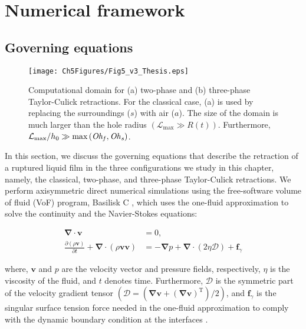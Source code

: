 \section{Numerical framework}\label{Ch6:sec::Num method}
\subsection{Governing equations}

\begin{figure}
	\centering
	\texttt{[image: Ch5Figures/Fig5\_v3\_Thesis.eps]}	
	\caption{Computational domain for (a) two-phase and (b) three-phase Taylor-Culick retractions. For the classical case, (a) is used by replacing the surroundings ($s$) with air ($a$). The size of the domain is much larger than the hole radius $(\mathcal{L}_\text{max} \gg R(t))$. Furthermore, $\mathcal{L}_\text{max}/h_0 \gg \text{max}\left(\mathit{Oh}_\mathit{f}, \mathit{Oh}_\mathit{s}\right)$.}
	\label{Ch6:fig:NumericalSetup}
\end{figure}

In this section, we discuss the governing equations that describe the retraction of a ruptured liquid film in the three configurations we study in this chapter, namely, the classical, two-phase, and three-phase Taylor-Culick retractions. We perform axisymmetric direct numerical simulations using the free-software volume of fluid (VoF) program, Basilisk C \citep{basiliskpopinet1, basiliskvatsaltc}, which uses the one-fluid approximation \citep{prosperetti2009computational, tryggvason2011direct} to solve the continuity and the Navier-Stokes equations:

\begin{align}
	\label{Ch6:Eqn::continuity}
	\boldsymbol{\nabla\cdot v} &= 0,\\ 
	\label{Ch6:Eqn::NS}
	\frac{\partial \left(\rho\boldsymbol{v}\right)}{\partial t} + \boldsymbol{\nabla\cdot}\left(\rho\boldsymbol{vv}\right) &= -\boldsymbol{\nabla} p + \boldsymbol{\nabla\cdot}\left(2\eta\boldsymbol{\mathcal{D}}\right) + \boldsymbol{f}_\gamma
\end{align}

\noindent where, $\boldsymbol{v}$ and $p$ are the velocity vector and pressure fields, respectively, $\eta$ is the viscosity of the fluid, and $t$ denotes time. Furthermore, $\boldsymbol{\mathcal{D}}$ is the symmetric part of the velocity gradient tensor $\left(\boldsymbol{\mathcal{D}} = \left(\boldsymbol{\nabla v} + \left(\boldsymbol{\nabla v}\right)^{\text{T}}\right)/2\right)$, and $\boldsymbol{f}_\gamma$ is the singular surface tension force needed in the one-fluid approximation to comply with the dynamic boundary condition at the interfaces \citep{brackbill1992continuum}. 

